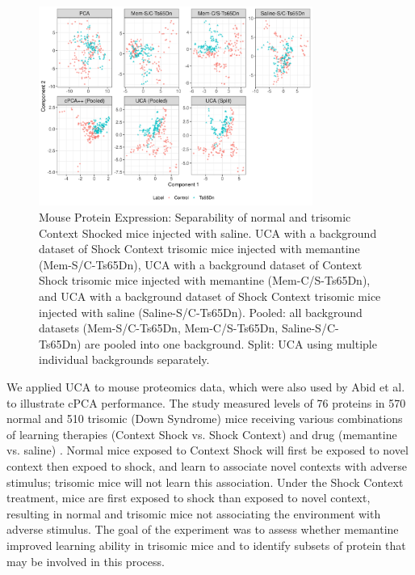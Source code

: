 \documentclass[nocrop]{bioinfo}
\begin{document}
\begin{methods}
\begin{figure}[th!]
  \centering
  \includegraphics[width = 0.8\textwidth]{figure/Mouse_split_stack_Ts65Dn_shapes.png}
  \caption{Mouse Protein Expression: Separability of normal and trisomic Context Shocked mice injected with saline. UCA with a background dataset of Shock Context trisomic mice injected with memantine (Mem-S/C-Ts65Dn), UCA with a background dataset of Context Shock trisomic mice injected with memantine (Mem-C/S-Ts65Dn), and UCA with a background dataset of Shock Context trisomic mice injected with saline (Saline-S/C-Ts65Dn). Pooled: all background datasets (Mem-S/C-Ts65Dn, Mem-C/S-Ts65Dn, Saline-S/C-Ts65Dn) are pooled into one background. Split: UCA using multiple individual backgrounds separately.}
  \label{fig:MouseSplitStack}
\end{figure}



We applied UCA to mouse proteomics data, which were also used by Abid et al. \cite{Abid} to illustrate cPCA performance. The study measured levels of 76 proteins in 570 normal and 510 trisomic (Down Syndrome) mice receiving various combinations of learning therapies (Context Shock vs. Shock Context) and drug (memantine vs. saline) \cite{Ahmed, Higuera, Abid}. Normal mice exposed to Context Shock will first be exposed to novel context then expoed to shock, and learn to associate novel contexts with adverse stimulus; trisomic mice will not learn this association. Under the Shock Context treatment, mice are first exposed to shock than exposed to novel context, resulting in normal and trisomic mice not associating the environment with adverse stimulus. The goal of the experiment was to assess whether memantine improved learning ability in trisomic mice and to identify subsets of protein that may be involved in this process.


\end{methods}
\end{document}

